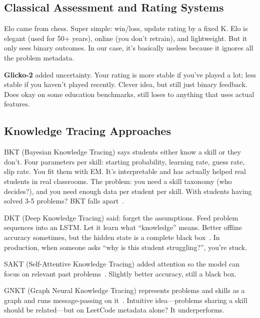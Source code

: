 \documentclass[conference]{IEEEtran}
\begin{document}
\subsection{Classical Assessment and Rating Systems}

Elo came from chess. Super simple: win/loss, update rating by a fixed K. Elo is elegant (used for 50+ years), online (you don't retrain), and lightweight. But it only sees binary outcomes. In our case, it's basically useless because it ignores all the problem metadata.

\textbf{Glicko-2} added uncertainty. Your rating is more stable if you've played a lot; less stable if you haven't played recently. Clever idea, but still just binary feedback. Does okay on some education benchmarks, still loses to anything that uses actual features.

\subsection{Knowledge Tracing Approaches}

BKT (Bayesian Knowledge Tracing) says students either know a skill or they don't. Four parameters per skill: starting probability, learning rate, guess rate, slip rate. You fit them with EM. It's interpretable and has actually helped real students in real classrooms. The problem: you need a skill taxonomy (who decides?), and you need enough data per student per skill. With students having solved 3-5 problems? BKT falls apart~\cite{corbett1994bkt,waters2015bkt_limitations}.

DKT (Deep Knowledge Tracing) said: forget the assumptions. Feed problem sequences into an LSTM. Let it learn what ``knowledge'' means. Better offline accuracy sometimes, but the hidden state is a complete black box~\cite{piech2015dkt}. In production, when someone asks ``why is this student struggling?'', you're stuck.

SAKT (Self-Attentive Knowledge Tracing) added attention so the model can focus on relevant past problems~\cite{pandey2019sakt}. Slightly better accuracy, still a black box.

GNKT (Graph Neural Knowledge Tracing) represents problems and skills as a graph and runs message-passing on it~\cite{yang2021gikt}. Intuitive idea---problems sharing a skill should be related---but on LeetCode metadata alone? It underperforms.
\end{document}
